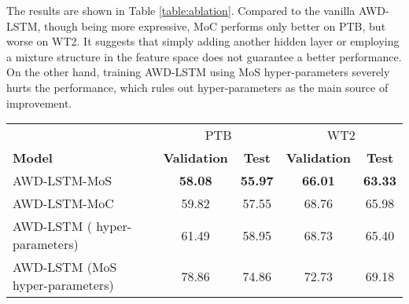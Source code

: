 The results are shown in Table \ref{table:ablation}. Compared to the vanilla AWD-LSTM, though being more expressive, MoC performs only better on PTB, but worse on WT2. It suggests that simply adding another hidden layer or employing a mixture structure in the feature space does not guarantee a better performance. On the other hand, training AWD-LSTM using MoS hyper-parameters severely hurts the performance, which rules out hyper-parameters as the main source of improvement.
\begin{table*}[!h]
	\small
	\centering
	\begin{tabular}{l|cc|cc}
		\toprule
		& \multicolumn{2}{c|}{PTB} & \multicolumn{2}{c}{WT2} \\
		\bf Model & \bf Validation &  \bf Test & \bf Validation &  \bf Test \\
		\midrule
		AWD-LSTM-MoS & \bf 58.08 & \bf 55.97 & \bf 66.01 & \bf 63.33\\
		AWD-LSTM-MoC & 59.82 & 57.55 & 68.76 & 65.98\\
		AWD-LSTM (\citet{merity2017regularizing} hyper-parameters) & 61.49 & 58.95 & 68.73 & 65.40\\
		AWD-LSTM (MoS hyper-parameters) & 78.86 & 74.86 & 72.73 & 69.18\\
		\bottomrule
	\end{tabular}
	\caption{\small
		Ablation study on Penn Treebank and WikiText-2 without finetuning or dynamical evaluation.
	}
	\label{table:ablation}
	\vspace{-1.5em}
\end{table*}

